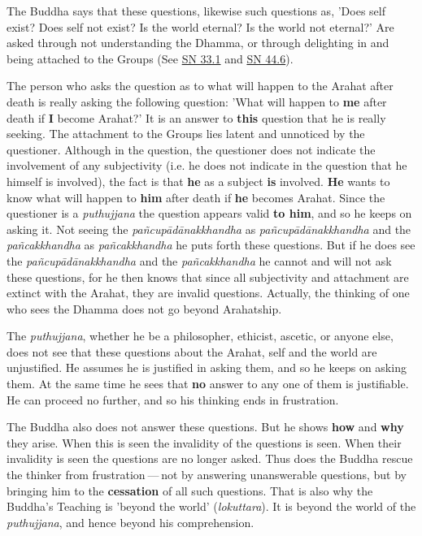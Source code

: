 The Buddha says that these questions, likewise such questions as, 'Does
self exist? Does self not exist? Is the world eternal? Is the world not
eternal?' Are asked through not understanding the Dhamma, or through
delighting in and being attached to the Groups
(See \href{https://suttacentral.net/sn33.1/en/sujato}{SN 33.1} and \href{https://suttacentral.net/sn44.6/en/bodhi}{SN 44.6}).


The person who asks the question as to what will happen to the Arahat
after death is really asking the following question: 'What will happen to
\textbf{me} after death if \textbf{I} become Arahat?' It is an answer to \textbf{this} question
that he is really seeking. The attachment to the Groups lies latent and
unnoticed by the questioner. Although in the question, the questioner
does not indicate the involvement of any subjectivity (i.e. he does not
indicate in the question that he himself is involved), the fact is that
\textbf{he} as a subject \textbf{is} involved. \textbf{He} wants to know what will happen to \textbf{him}
after death if \textbf{he} becomes Arahat. Since the questioner is a \emph{puthujjana}
the question appears valid \textbf{to him}, and so he keeps on asking it. Not
seeing the \emph{pañcupādānakkhandha} as \emph{pañcupādānakkhandha} and the
\emph{pañcakkhandha} as \emph{pañcakkhandha} he puts forth these questions. But if he
does see the \emph{pañcupādānakkhandha} and the \emph{pañcakkhandha} he cannot and
will not ask these questions, for he then knows that since all
subjectivity and attachment are extinct with the Arahat, they are
invalid questions. Actually, the thinking of one who sees the Dhamma
does not go beyond Arahatship.


The \emph{puthujjana}, whether he be a philosopher, ethicist, ascetic, or
anyone else, does not see that these questions about the Arahat, self
and the world are unjustified. He assumes he is justified in asking them,
and so he keeps on asking them. At the same time he sees that \textbf{no} answer
to any one of them is justifiable. He can proceed no further, and so his
thinking ends in frustration.


The Buddha also does not answer these questions. But he shows \textbf{how} and
\textbf{why} they arise. When this is seen the invalidity of the questions is
seen. When their invalidity is seen the questions are no longer asked.
Thus does the Buddha rescue the thinker from frustration — not by
answering unanswerable questions, but by bringing him to the \textbf{cessation}
of all such questions. That is also why the Buddha’s Teaching is 'beyond
the world' (\emph{lokuttara}). It is beyond the world of the \emph{puthujjana}, and
hence beyond his comprehension.



